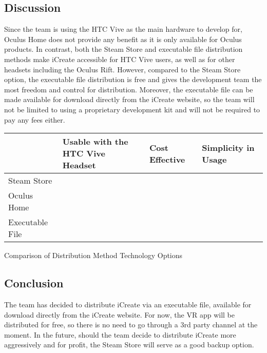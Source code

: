 \documentclass[letterpaper,10pt,onecolumn,compsoc]{IEEEtran}
\begin{document}
\subsection{Discussion}
Since the team is using the HTC Vive as the main hardware to develop for, Oculus Home does not provide any benefit as it is only available for Oculus products. In contrast, both the Steam Store and executable file distribution methods make iCreate accessible for HTC Vive users, as well as for other headsets including the Oculus Rift. However, compared to the Steam Store option, the executable file distribution is free and gives the development team the most freedom and control for distribution. Moreover, the executable file can be made available for download directly from the iCreate website, so the team will not be limited to using a proprietary development kit and will not be required to pay any fees either.


\begin{center}
\begin{tabular}{ | P{3.5cm} | P{6cm} | P{2.5cm} | P{3.5cm} | } 
 	\hline
 	 & Usable with the HTC Vive Headset & Cost Effective & Simplicity in Usage \\ 
 	\hline
 	Steam Store & \checkmark & &  \\ 
 	\hline
 	Oculus Home & & \checkmark &  \\ 
 	\hline
 	Executable File & \checkmark & \checkmark & \checkmark \\ 
 	\hline
\end{tabular}
\end{center}

\begin{center}
Comparison of Distribution Method Technology Options
\end{center}

\subsection{Conclusion}
The team has decided to distribute iCreate via an executable file, available for download directly from the iCreate website. For now, the VR app will be distributed for free, so there is no need to go through a 3rd party channel at the moment. In the future, should the team decide to distribute iCreate more aggressively and for profit, the Steam Store will serve as a good backup option.

\end{document}
